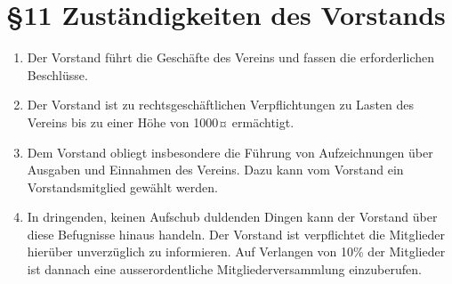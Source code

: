 \section*{§11 Zuständigkeiten des Vorstands}
\begin{enumerate}
\item Der Vorstand führt die Geschäfte des Vereins und fassen die erforderlichen
Beschlüsse.
\item Der Vorstand ist zu rechtsgeschäftlichen Verpflichtungen zu Lasten
des Vereins bis zu einer Höhe von 1000¤ ermächtigt.
\item Dem Vorstand obliegt insbesondere die Führung von Aufzeichnungen über
Ausgaben und Einnahmen des Vereins. Dazu kann vom Vorstand ein Vorstandsmitglied
gewählt werden.
\item In dringenden, keinen Aufschub duldenden Dingen kann der Vorstand
über diese Befugnisse hinaus handeln. Der Vorstand ist verpflichtet
die Mitglieder hierüber unverzüglich zu informieren. Auf Verlangen
von 10\% der Mitglieder ist dannach eine ausserordentliche Mitgliederversammlung
einzuberufen.
\end{enumerate}
